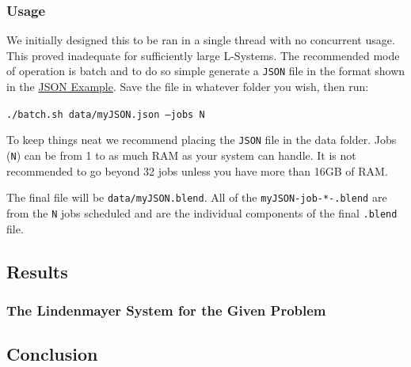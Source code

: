 \subsubsection{Usage}
We initially designed this to be ran in a single thread with no concurrent 
usage. This proved inadequate for sufficiently large L-Systems. The recommended 
mode of operation is batch and to do so simple generate a \texttt{JSON} file in 
the format shown in the \hyperref[code:prob1_json]{JSON Example}. Save the file 
in whatever folder you wish, then run:

\texttt{./batch.sh data/myJSON.json --jobs N}

To keep things neat we recommend placing the \texttt{JSON} file in the data 
folder. Jobs (\texttt{N}) can be from 1 to as much RAM as your system can 
handle. It is not recommended to go beyond 32 jobs unless you have more than 
16GB of RAM.

The final file will be \texttt{data/myJSON.blend}. All of the 
\texttt{myJSON-job-*-.blend} are from the \texttt{N} jobs scheduled and are the 
individual components of the final \texttt{.blend} file.



\subsection{Results}

\subsubsection{The Lindenmayer System for the Given Problem}


\subsection{Conclusion}
